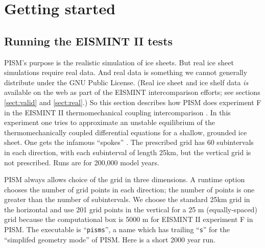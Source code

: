 \documentclass[11pt,final]{amsart}
\renewcommand{\t}[1]{\texttt{#1}}
\begin{document}
\clearpage\newpage
\section{Getting started}\label{sect:start}

\subsection{Running the EISMINT II tests}  PISM's purpose is the realistic simulation of ice sheets.  But real ice sheet simulations require real data.  And real data is something we cannot generally distribute under the GNU Public License.  (Real ice sheet and ice shelf data \emph{is} available on the web as part of the EISMINT intercomparison efforts; see sections \ref{sect:valid} and \ref{sect:real}.)  So this section describes how PISM does experiment F in the EISMINT II thermomechanical coupling intercomparison \cite{EISMINT00}.  In this experiment one tries to approximate an unstable equilibrium of the thermomechanically coupled differential equations for a shallow, grounded ice sheet.  One gets the infamous ``spokes'' \cite{BBL,PayneBaldwin}.  The prescribed grid has 60 subintervals in each direction, with each subinterval of length 25km, but the vertical grid is not prescribed.  Runs are for 200,000 model years.

PISM always allows choice of the grid in three dimensions.  A runtime option chooses the number of grid points in each direction; the number of points is one greater than the number of subintervals.  We choose the standard 25km grid in the horizontal and use 201 grid points in the vertical for a 25 m (equally-spaced) grid because the computational box is 5000 m for EISMINT II experiment F in PISM.  The executable is ``\t{pisms}'', a name which has trailing ``\t{s}'' for the ``simplifed geometry mode'' of PISM.  Here is a short 2000 year run.
\end{document}
